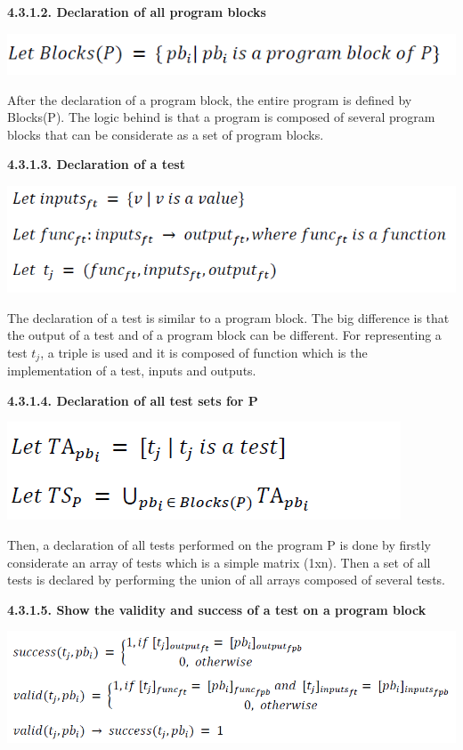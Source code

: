 \documentclass[conference,compsoc]{IEEEtran}
\begin{document}
\noindent
\newline
\textbf{4.3.1.2. Declaration of all program blocks}
\begin{center}
\includegraphics[scale=0.5]{Proof1-Part2.png} 
\end{center}

After the declaration of a program block, the entire program is defined by Blocks(P). The logic behind is that a program is composed of several program blocks that can be considerate as a set of program blocks. 

\noindent
\newpage
\textbf{4.3.1.3. Declaration of a test}
\begin{center}
\includegraphics[scale=0.5]{Proof1-Part3.png} 
\end{center}

The declaration of a test is similar to a program block. The big difference is that the output of a test and of a program block can be different. For representing a test $t_j$, a triple is used and it is composed of function which is the implementation of a test, inputs and outputs.  

\noindent
\newline
\textbf{4.3.1.4. Declaration of all test sets for P}
\begin{center}
\includegraphics[scale=0.5]{Proof1-Part4.png} 
\end{center}

Then, a declaration of all tests performed on the program P is done by firstly considerate an array of tests which is a simple matrix (1xn). Then a set of all tests is declared by performing the union of all arrays composed of several tests. 

\noindent
\newline
\textbf{4.3.1.5. Show the validity and success of a test on a program block}
\begin{center}
\includegraphics[scale=0.5]{Proof1-Part5.png} 
\end{center}
\end{document}
